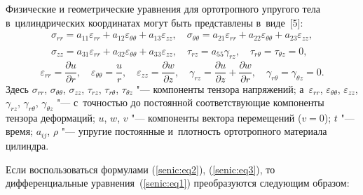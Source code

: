 Физические и геометрические уравнения для ортотропного упругого тела 
в~цилиндрических координатах могут быть представлены в~виде~[5]:
\begin{equation}
\label{senic:eq2}
 \begin{array}{l}
\displaystyle
\sigma _{rr} = a_{11} \varepsilon _{rr} + a_{12} \varepsilon _{\theta \theta 
} + a_{13} \varepsilon _{zz},
\quad 
\sigma _{\theta \theta } = a_{21} \varepsilon _{rr} + a_{22} \varepsilon _{\theta \theta } + a_{23}\varepsilon _{zz},
\\ \displaystyle
\sigma _{zz} = a_{31} \varepsilon _{rr} + a_{32} \varepsilon _{\theta \theta 
} + a_{33} \varepsilon _{zz},\quad \tau _{rz} = a_{55} \gamma _{rz} ,\quad \tau_{r\theta } = \tau _{\theta z} = 0,^{\phantom{\frac12}}
\end{array}
\end{equation}
\begin{equation}
\label{senic:eq3}
\varepsilon _{rr} = \frac{\partial u}{\partial r},\quad 
\varepsilon _{\theta \theta } = \frac{u}{r},\quad 
\varepsilon _{zz} = \frac{\partial w}{\partial z},\quad
\gamma _{rz} = \frac{\partial u}{\partial z} + \frac{\partial w}{\partial r},\quad 
\gamma _{r\theta } = \gamma _{\theta z} = 0.
\end{equation}
Здесь $\sigma _{rr}$, $\sigma _{\theta \theta }$, $\sigma _{zz}$, $\tau _{rz}$, 
$\tau _{r\theta }$, $\tau _{\theta z}$ "--- компоненты тензора напряжений; 
а~$\varepsilon _{rr}$, $\varepsilon _{\theta \theta }$, $\varepsilon _{zz}$, 
$\gamma_{rz}$, $\gamma _{r\theta }$, $\gamma _{\theta z}$ "--- с~точностью до постоянной 
соответствующие компоненты тензора деформаций; $u$, $w$, $v$ "--- компоненты 
вектора перемещений ($v=0$); $t $ "--- время; $a_{ij}$, $\rho $ "--- упругие постоянные и~плотность ортотропного материала цилиндра.

Если воспользоваться формулами (\ref{senic:eq2}), (\ref{senic:eq3}), то дифференциальные уравнения~(\ref{senic:eq1}) 
преобразуются следующим образом:

